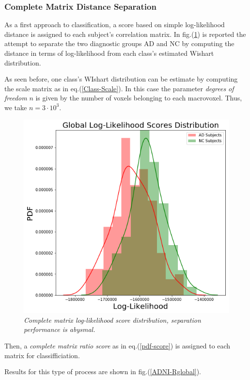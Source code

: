\documentclass[12pt,openright,twoside,a4paper]{book}
\begin{document}
\subsubsection*{Complete Matrix Distance Separation}

As a first approach to classification, a score based on simple log-likelihood distance is assigned to each subject's correlation matrix. In fig.(\ref{ADNI-global}) is reported the attempt to separate the two diagnostic groups AD and NC by computing the distance in terms of log-likelihood from each class's estimated Wishart distribution.

As seen before, one class's WIshart distribution can be estimate by computing the scale matrix as in eq.(\ref{Class-Scale}). 
In this case the parameter \textit{degrees of freedom} $n$ is given by the number of voxels belonging to each macrovoxel. Thus, we take $n=3\cdot 10^3$.

\begin{figure}[!h]
\centering
\includegraphics[scale=0.5]{ADNI-global}
\caption{\textit{Complete matrix log-likelihood score distribution, separation performance is abysmal.}}
\label{ADNI-global}
\end{figure}

Then, a \textit{complete matrix ratio score} as in eq.(\ref{pdf-score}) is assigned to each matrix for classifficiation. 

Results for this type of process are shown in fig.(\ref{ADNI-Rglobal}).
\end{document}
